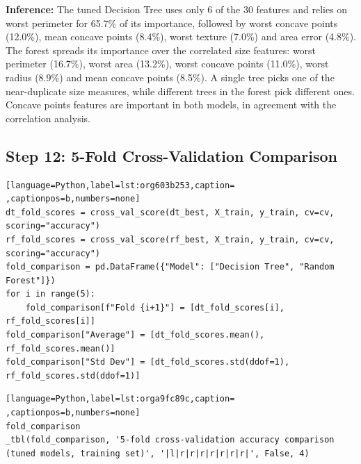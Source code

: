 \documentclass[11pt]{article}
\begin{document}
\textbf{Inference:} The tuned Decision Tree uses only 6 of the 30 features and relies on worst perimeter for
65.7\% of its importance, followed by worst concave points (12.0\%), mean concave points
(8.4\%), worst texture (7.0\%) and area error (4.8\%). The forest spreads its importance over
the correlated size features: worst perimeter (16.7\%), worst area (13.2\%), worst concave
points (11.0\%), worst radius (8.9\%) and mean concave points (8.5\%). A single tree picks one
of the near-duplicate size measures, while different trees in the forest pick different
ones. Concave points features are important in both models, in agreement with the
correlation analysis.

\subsection*{Step 12: 5-Fold Cross-Validation Comparison}
\label{sec:orgbe24c25}

\begin{lstlisting}[language=Python,label=lst:org603b253,caption= ,captionpos=b,numbers=none]
dt_fold_scores = cross_val_score(dt_best, X_train, y_train, cv=cv, scoring="accuracy")
rf_fold_scores = cross_val_score(rf_best, X_train, y_train, cv=cv, scoring="accuracy")
fold_comparison = pd.DataFrame({"Model": ["Decision Tree", "Random Forest"]})
for i in range(5):
    fold_comparison[f"Fold {i+1}"] = [dt_fold_scores[i], rf_fold_scores[i]]
fold_comparison["Average"] = [dt_fold_scores.mean(), rf_fold_scores.mean()]
fold_comparison["Std Dev"] = [dt_fold_scores.std(ddof=1), rf_fold_scores.std(ddof=1)]
\end{lstlisting}

\begin{lstlisting}[language=Python,label=lst:orga9fc89c,caption= ,captionpos=b,numbers=none]
fold_comparison
_tbl(fold_comparison, '5-fold cross-validation accuracy comparison (tuned models, training set)', '|l|r|r|r|r|r|r|r|', False, 4)
\end{lstlisting}
\end{document}
